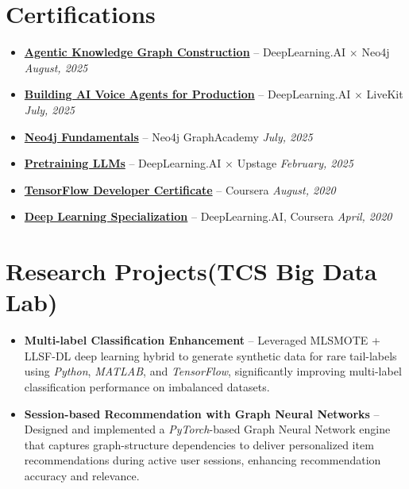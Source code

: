 \documentclass[letterpaper,11pt]{article}
\begin{document}
\section{Certifications}
\begin{itemize}[leftmargin=0.15in, label={}]
    \small
    \item \href{https://learn.deeplearning.ai/accomplishments/47fc6775-2474-459c-823f-d9835dff4c92}{\textbf{Agentic Knowledge Graph Construction}} -- DeepLearning.AI $\times$ Neo4j \hfill \textit{August, 2025}
    \item \href{https://learn.deeplearning.ai/accomplishments/576a1433-07cf-43ed-b823-11a6833bcf7c}{\textbf{Building AI Voice Agents for Production}} -- DeepLearning.AI $\times$ LiveKit \hfill \textit{July, 2025}
    \item \href{https://graphacademy.neo4j.com/c/cd58c648-ed44-4417-9432-45593d54d65f/}{\textbf{Neo4j Fundamentals}} -- Neo4j GraphAcademy \hfill \textit{July, 2025}
    \item \href{https://learn.deeplearning.ai/accomplishments/4e81d8a9-58e3-4e21-bf4c-eb6591b7057c}{\textbf{Pretraining LLMs}} -- DeepLearning.AI $\times$ Upstage \hfill \textit{February, 2025}
    \item \href{https://coursera.org/share/416c0c85f67457b5b242f15f63cd6814}{\textbf{TensorFlow Developer Certificate}} -- Coursera \hfill \textit{August, 2020}
    \item \href{https://www.coursera.org/account/accomplishments/specialization/R3ZCXXTTVHS8}{\textbf{Deep Learning Specialization}} -- DeepLearning.AI, Coursera \hfill \textit{April, 2020}

\end{itemize}

\section{Research Projects(TCS Big Data Lab)}
\begin{itemize}[leftmargin=0.15in, label={}]
    \small
    \item \textbf{Multi-label Classification Enhancement} -- Leveraged MLSMOTE + LLSF-DL deep learning hybrid to generate synthetic data for rare tail-labels using \textit{Python}, \textit{MATLAB}, and \textit{TensorFlow}, significantly improving multi-label classification performance on imbalanced datasets.
    \item \textbf{Session-based Recommendation with Graph Neural Networks} -- Designed and implemented a \textit{PyTorch}-based Graph Neural Network engine that captures graph-structure dependencies to deliver personalized item recommendations during active user sessions, enhancing recommendation accuracy and relevance.
\end{itemize}
\end{document}
